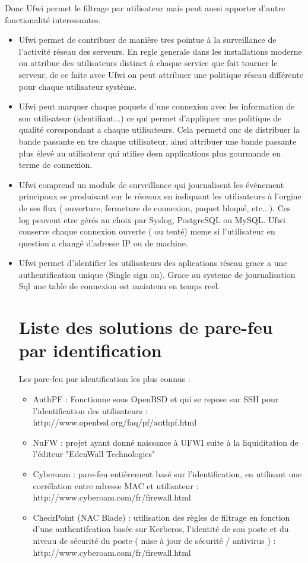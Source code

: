 \documentclass[12pt]{report}
\begin{document}
Donc Ufwi permet le filtrage par utilisateur mais peut aussi apporter d'autre fonctionalité interessantes.\newline
\begin{itemize}
    \item Ufwi permet de contribuer de manière tres pointue à la surveillance de l'activité réseau des serveurs. En regle generale dans les installations moderne on attribue des utilisateurs distinct à chaque service que fait tourner le serveur, de ce faite avec Ufwi on peut attribuer une politique réseau différente pour chaque utilisateur système.\newline
    \item Ufwi peut marquer chaque paquets d'une connexion avec les information de son utilisateur (identifiant...) ce qui permet d'appliquer une politique de qualité corespondant a chaque utilisateurs. Cela permetd onc de distribuer la bande passante en tre chaque utilisateur, ainsi attribuer une bande passante plus élevé au utilisateur qui utilise desn applications plus gourmande en terme de connexion.\newline
    \item Ufwi comprend un module de surveillance qui journalisent les événement principaux se produisant sur le réseaux en indiquant les utilisateurs à l'orgine de ses flux ( ouverture, fermeture de connexion, paquet bloqué, etc...). Ces log peuvent etre gérés au choix par Syslog, PostgreSQL ou MySQL. Ufwi conserve chaque connexion ouverte ( ou tenté) meme si l'utilisateur en question a changé d'adresse IP ou de machine.\newline
    \item Ufwi permet d'identifier les utilisateurs des aplications réseau grace a une authentification unique (Single sign on). Grace au systeme de journalisation Sql une table de connexion est maintenu en temps reel.  
\chapter{Liste des solutions de pare-feu par identification}
Les pare-feu par identification les plus connus : 
  \begin{itemize}
    \item AuthPF : Fonctionne sous OpenBSD et qui se repose sur SSH pour l'identification des utilisateurs : http://www.openbsd.org/faq/pf/authpf.html
    \item NuFW : projet ayant donné naissance à UFWI suite à la liquiditation de l'éditeur "EdenWall Technologies"
    \item Cyberoam : pare-feu entièrement basé sur l'identification, en utilisant une corrélation entre adresse MAC et utilisateur : http://www.cyberoam.com/fr/firewall.html
    \item CheckPoint (NAC Blade) : utilisation des règles de filtrage en fonction d'une authentifcation basée sur Kerberos, l'identité de son poste et du niveau de sécurité du poste ( mise à jour de sécurité / antivirus ) : http://www.cyberoam.com/fr/firewall.html
    

\end{itemize}
\end{itemize}
\end{document}
